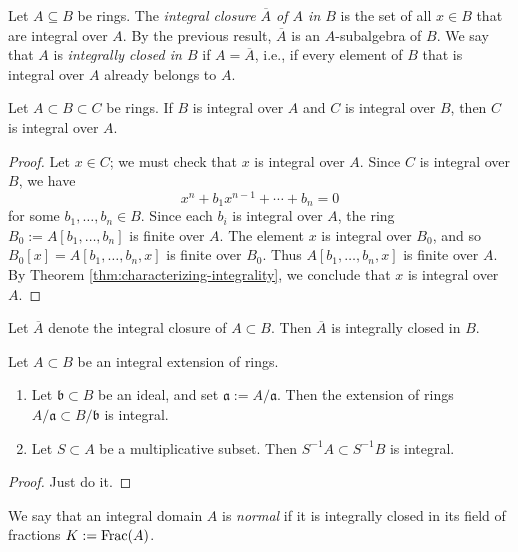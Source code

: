 \documentclass[10pt]{article}
\begin{document}
\begin{definition}
  Let $A \subseteq B$ be rings.
  The \emph{integral closure $\overline{A}$ of $A$ in $B$}
  is the set of all $x \in B$ that are integral over $A$.
  By the previous result, $\overline{A}$ is an $A$-subalgebra of $B$.
  We say that $A$ is \emph{integrally closed in $B$}
  if $A = \overline{A}$,
  i.e., if every element of $B$ that is integral over $A$ already belongs to $A$.
\end{definition}

\begin{lemma}
  Let $A \subset B \subset C$ be rings.
  If $B$ is integral over $A$ and
  $C$ is integral over $B$,
  then $C$ is integral over $A$.
\end{lemma}
\begin{proof}
  Let $x \in C$;
  we must check that $x$ is integral over $A$.
  Since $C$ is integral over $B$, we have
  \[
  x^n + b_1 x^{n-1} + \dotsb + b_n = 0
  \]
  for some $b_1,\dotsc,b_n \in B$.  Since each $b_i$ is integral
  over $A$, the ring $B_0 := A[b_1,\dotsc,b_n]$ is finite over
  $A$.  The element $x$ is integral over $B_0$, and so
  $B_0[x]= A[b_1,\dotsc,b_n,x]$ is finite over $B_0$.  Thus
  $A[b_1,\dotsc,b_n,x]$ is finite over $A$.  By Theorem
  \ref{thm:characterizing-integrality}, we conclude that $x$ is
  integral over $A$.
\end{proof}

\begin{corollary}
  Let $\overline{A}$ denote the integral
  closure of $A \subset B$.
  Then $\overline{A}$ is integrally closed in $B$.
\end{corollary}


\begin{lemma}
  Let $A \subset B$ be an integral extension of rings.
  \begin{enumerate}
  \item Let $\mathfrak{b} \subset B$ be an ideal, and set
    $\mathfrak{a} := A/\mathfrak{a}$.
    Then
    the extension of rings
    $A / \mathfrak{a} \subset B / \mathfrak{b}$ is integral.
  \item Let $S \subset A$ be a multiplicative subset.
    Then $S^{-1} A \subset S^{-1} B$ is integral.
  \end{enumerate}
\end{lemma}
\begin{proof}
  Just do it.
\end{proof}

\begin{definition}
  We say that an integral domain $A$ is \emph{normal}
  if it is integrally closed in its field of fractions $K := \operatorname{Frac}(A)$.
\end{definition}
\end{document}
